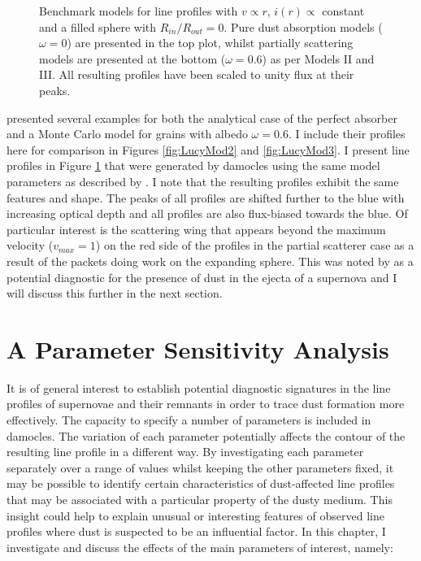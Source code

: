 \begin{figure}
\begin{subfigure}{\textwidth}
\end{subfigure}  
\caption{Benchmark models for line profiles  with $v \propto r$, $i(r) \propto$ constant and a filled sphere with $R_{in}/R_{out}=0$.  Pure dust absorption models ($\omega = 0$) are presented in the top plot, whilst partially scattering models are presented at the bottom ($\omega = 0.6$) as per \citet{Lucy1989} Models II and III. All resulting profiles have been scaled to unity flux at their peaks.}
\label{fig:Lucy}
\end{figure}


\citet{Lucy1989} presented several examples for both the analytical case of 
the perfect absorber and a Monte Carlo model for grains with albedo $\omega 
=0.6$.  I include their profiles here for comparison in Figures \ref{fig:LucyMod2} and \ref{fig:LucyMod3}.  I  present line profiles in Figure \ref{fig:Lucy} that were generated by {\sc damocles} using the same model parameters as described by \citet{Lucy1989}.  I note that 
the resulting profiles exhibit the same features and shape. The peaks of all profiles are shifted further to the blue with increasing optical depth and all profiles are also flux-biased towards the blue.  Of particular 
interest is the scattering wing that appears beyond the maximum velocity 
($v_{max}=1$) on the red side of the profiles in the partial 
scatterer case as a result of the packets doing work on the expanding sphere.  
This was noted by \citet{Lucy1989} as a potential diagnostic for the 
presence of dust in the ejecta of a supernova and I  will discuss this 
further in the next section.




\section{A Parameter Sensitivity Analysis}
\label{param_sens_analysis}
It is of general interest to establish potential diagnostic signatures in 
the line profiles of supernovae and their remnants in order to trace dust 
formation more effectively. The capacity to specify a number of parameters is included in {\sc damocles}.  The variation of each parameter potentially affects the contour of the resulting line profile in a different way.  By investigating each parameter separately over a range of values whilst keeping the other parameters fixed, it may be possible to identify certain characteristics of dust-affected line profiles that may be associated with a particular property of the dusty medium.  This insight could help to explain unusual or interesting features of observed line profiles where dust is suspected to be an influential factor.  In this chapter, I investigate and discuss the effects of the main 
parameters of interest, namely:

